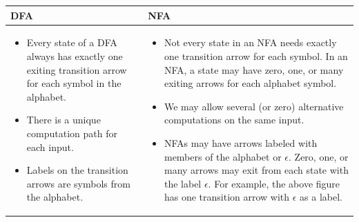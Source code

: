 \documentclass[letterpaper]{article}
\begin{document}
\begin{center}
    \begin{tabular}{p{3in}|p{3in}}
        \textbf{DFA} & \textbf{NFA} \\ 
        \hline 
        \begin{itemize}
            \item Every state of a DFA always has exactly one exiting transition arrow for each symbol in the alphabet.
            \item There is a unique computation path for each input. 
            \item Labels on the transition arrows are symbols from the alphabet. 
        \end{itemize} 

        & \begin{itemize}
            \item Not every state in an NFA needs exactly one transition arrow for each symbol. In an NFA, a state may have zero, one, or many exiting arrows for each alphabet symbol.
            \item We may allow several (or zero) alternative computations on the same input. 
            \item NFAs may have arrows labeled with members of the alphabet or $\epsilon$. Zero, one, or many arrows may exit from each state with the label $\epsilon$. For example, the above figure has one transition arrow with $\epsilon$ as a label. 
        \end{itemize}
    \end{tabular}
\end{center}
\end{document}
